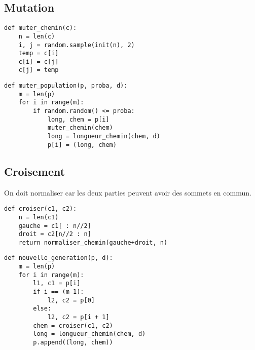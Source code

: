 \subsection{Mutation}
\begin{Exercise}[title = {\bf III.C.1)}]
\begin{lstlisting}
def muter_chemin(c):
    n = len(c)
    i, j = random.sample(init(n), 2)
    temp = c[i]
    c[i] = c[j]
    c[j] = temp
\end{lstlisting}
\end{Exercise}
\begin{Exercise}[title = {\bf III.C.2)}]
\begin{lstlisting}
def muter_population(p, proba, d):
    m = len(p)
    for i in range(m):
        if random.random() <= proba:
            long, chem = p[i]
            muter_chemin(chem)
            long = longueur_chemin(chem, d)
            p[i] = (long, chem)
\end{lstlisting}
\end{Exercise}
\subsection{Croisement}
\begin{Exercise}[title = {\bf III.D.1)}]
On doit normaliser car les deux parties peuvent avoir des sommets en commun.
\begin{lstlisting}
def croiser(c1, c2):
    n = len(c1)
    gauche = c1[ : n//2]
    droit = c2[n//2 : n]
    return normaliser_chemin(gauche+droit, n)
\end{lstlisting}
\end{Exercise}
\begin{Exercise}[title = {\bf III.D.2)}]
\begin{lstlisting}
def nouvelle_generation(p, d):
    m = len(p)
    for i in range(m):
        l1, c1 = p[i]
        if i == (m-1):
            l2, c2 = p[0]
        else:
            l2, c2 = p[i + 1]
        chem = croiser(c1, c2)
        long = longueur_chemin(chem, d)
        p.append((long, chem))
\end{lstlisting}
\end{Exercise}
\newpage
